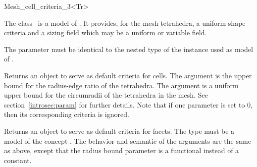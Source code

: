 \ccRefPageBegin


\begin{ccRefFunctionObjectClass}{Mesh_cell_criteria_3<Tr>}  %


\ccDefinition
  
The class \ccRefName\ is a model of . It provides,
for the  mesh tetrahedra,
 a uniform shape criteria 
and a sizing field which may be a uniform or variable field.


\ccParameters
The parameter  must be identical to the nested type
 of the instance used as model of
.

\ccIsModel
{}


\ccTypes


\ccCreation
{}  %

{Returns an object to serve as default criteria  for cells. The argument 
 is the  upper bound for the radius-edge ratio
of the tetrahedra. The argument  is a uniform upper bound
for the circumradii of the tetrahedra in the mesh. See
section~\ref{introsec:param} for further details.
Note that if one parameter is set to 0, then its corresponding criteria is ignored.}

{Returns an object to serve as default criteria for facets. The type  must
be a model of the concept . The behavior and semantic of the arguments are the same 
as above, except that the radius bound parameter is a functional instead of a constant.}




\end{ccRefFunctionObjectClass}

